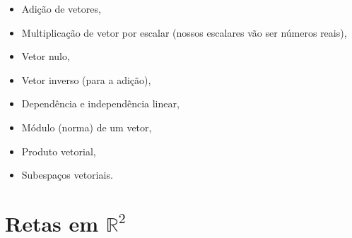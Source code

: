 \documentclass[
  letterpaper,
  DIV=11,
  numbers=noendperiod]{scrreprt}
\providecommand{\tightlist}{%
  \setlength{\itemsep}{0pt}\setlength{\parskip}{0pt}}\usepackage{longtable,booktabs,array}
\begin{document}
\begin{itemize}
  \begin{itemize}
  \tightlist
  \item
    Adição de vetores,
  \item
    Multiplicação de vetor por escalar (nossos escalares vão ser números
    reais),
  \item
    Vetor nulo,
  \item
    Vetor inverso (para a adição),
  \item
    Dependência e independência linear,
  \item
    Módulo (norma) de um vetor,
  \item
    Produto vetorial,
  \item
    Subespaços vetoriais.
  \end{itemize}
\end{itemize}

\hypertarget{sec-retas}{%
\section{\texorpdfstring{Retas em
$\mathbb{R}^2$}{Retas em }}\label{sec-retas}}
\end{document}
